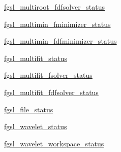 \begin{DoxyCompactItemize}
\item 
\hyperlink{interfacefgsl__well__defined_a86de4acfd0934e7031d6b7dcfadcf9ed}{fgsl\-\_\-multiroot\-\_\-fdfsolver\-\_\-status}
\item 
\hyperlink{interfacefgsl__well__defined_a1b315c8666e00622ce281cde85ba8588}{fgsl\-\_\-multimin\-\_\-fminimizer\-\_\-status}
\item 
\hyperlink{interfacefgsl__well__defined_aef39dbce8fd62a2b6a90703b9b8aa4c3}{fgsl\-\_\-multimin\-\_\-fdfminimizer\-\_\-status}
\item 
\hyperlink{interfacefgsl__well__defined_a47c40d8d9b01497173fda6640a594ec7}{fgsl\-\_\-multifit\-\_\-status}
\item 
\hyperlink{interfacefgsl__well__defined_ae18c82ae3950b0f3e54fd2379036dad2}{fgsl\-\_\-multifit\-\_\-fsolver\-\_\-status}
\item 
\hyperlink{interfacefgsl__well__defined_a8e6d0998e8d21ce188d65bbfd4db5a48}{fgsl\-\_\-multifit\-\_\-fdfsolver\-\_\-status}
\item 
\hyperlink{interfacefgsl__well__defined_a4000a5b61590070cd8377b97f1f17b32}{fgsl\-\_\-file\-\_\-status}
\item 
\hyperlink{interfacefgsl__well__defined_a49e5361b6de478db906c033df481ece0}{fgsl\-\_\-wavelet\-\_\-status}
\item 
\hyperlink{interfacefgsl__well__defined_a2a9c7129ba6e03f8aca7077360032044}{fgsl\-\_\-wavelet\-\_\-workspace\-\_\-status}
\end{DoxyCompactItemize}


